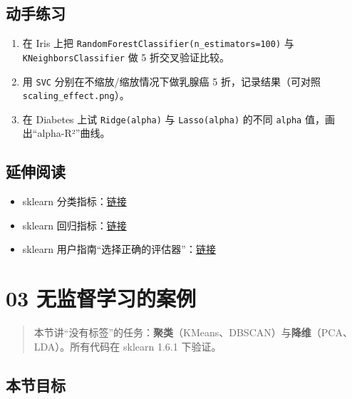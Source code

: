 \subsection{动手练习}\label{ux52a8ux624bux7ec3ux4e60-6}

\begin{enumerate}
\def\labelenumi{\arabic{enumi}.}
\tightlist
\item
  在 Iris 上把 \texttt{RandomForestClassifier(n\_estimators=100)} 与
  \texttt{KNeighborsClassifier} 做 5 折交叉验证比较。
\item
  用 \texttt{SVC} 分别在不缩放/缩放情况下做乳腺癌 5 折，记录结果（可对照
  \texttt{scaling\_effect.png}）。
\item
  在 Diabetes 上试 \texttt{Ridge(alpha)} 与 \texttt{Lasso(alpha)} 的不同
  \texttt{alpha} 值，画出``alpha-R²''曲线。
\end{enumerate}

\subsection{延伸阅读}\label{ux5ef6ux4f38ux9605ux8bfb-35}

\begin{itemize}
\tightlist
\item
  sklearn
  分类指标：\href{https://scikit-learn.org/stable/modules/model_evaluation.html\#classification-metrics}{链接}
\item
  sklearn
  回归指标：\href{https://scikit-learn.org/stable/modules/model_evaluation.html\#regression-metrics}{链接}
\item
  sklearn
  用户指南``选择正确的评估器''：\href{https://scikit-learn.org/stable/modules/preprocessing.html}{链接}
\end{itemize}

\section{03
无监督学习的案例}\label{ux65e0ux76d1ux7763ux5b66ux4e60ux7684ux6848ux4f8b}

\begin{quote}
本节讲``没有标签''的任务：\textbf{聚类}（KMeans、DBSCAN）与\textbf{降维}（PCA、LDA）。所有代码在
sklearn 1.6.1 下验证。
\end{quote}

\subsection{本节目标}\label{ux672cux8282ux76eeux6807-30}

